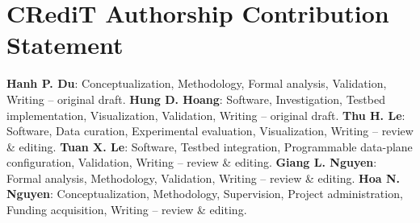 \documentclass[final,5p]{elsarticle}
\begin{document}
\section*{CRediT Authorship Contribution Statement}
\textbf{Hanh P. Du}: Conceptualization, Methodology, Formal analysis, Validation, Writing -- original draft.
\textbf{Hung D. Hoang}: Software, Investigation, Testbed implementation, Visualization, Validation, Writing -- original draft.
\textbf{Thu H. Le}: Software, Data curation, Experimental evaluation, Visualization, Writing -- review \& editing.
\textbf{Tuan X. Le}: Software, Testbed integration, Programmable data-plane configuration, Validation, Writing -- review \& editing.
\textbf{Giang L. Nguyen}: Formal analysis, Methodology, Validation, Writing -- review \& editing.
\textbf{Hoa N. Nguyen}: Conceptualization, Methodology, Supervision, Project administration, Funding acquisition, Writing -- review \& editing.




\end{document}
